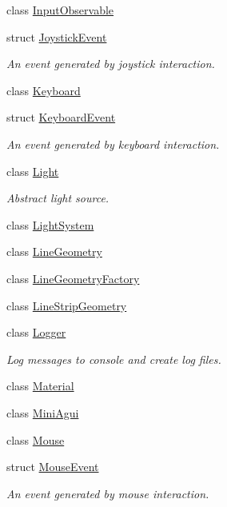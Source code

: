 \begin{DoxyCompactItemize}
class \mbox{\hyperlink{classec_1_1_input_observable}{Input\+Observable}}
\item 
struct \mbox{\hyperlink{structec_1_1_joystick_event}{Joystick\+Event}}
\begin{DoxyCompactList}\small\item\em An event generated by joystick interaction. \end{DoxyCompactList}\item 
class \mbox{\hyperlink{classec_1_1_keyboard}{Keyboard}}
\item 
struct \mbox{\hyperlink{structec_1_1_keyboard_event}{Keyboard\+Event}}
\begin{DoxyCompactList}\small\item\em An event generated by keyboard interaction. \end{DoxyCompactList}\item 
class \mbox{\hyperlink{classec_1_1_light}{Light}}
\begin{DoxyCompactList}\small\item\em Abstract light source. \end{DoxyCompactList}\item 
class \mbox{\hyperlink{classec_1_1_light_system}{Light\+System}}
\item 
class \mbox{\hyperlink{classec_1_1_line_geometry}{Line\+Geometry}}
\item 
class \mbox{\hyperlink{classec_1_1_line_geometry_factory}{Line\+Geometry\+Factory}}
\item 
class \mbox{\hyperlink{classec_1_1_line_strip_geometry}{Line\+Strip\+Geometry}}
\item 
class \mbox{\hyperlink{classec_1_1_logger}{Logger}}
\begin{DoxyCompactList}\small\item\em Log messages to console and create log files. \end{DoxyCompactList}\item 
class \mbox{\hyperlink{classec_1_1_material}{Material}}
\item 
class \mbox{\hyperlink{classec_1_1_mini_agui}{Mini\+Agui}}
\item 
class \mbox{\hyperlink{classec_1_1_mouse}{Mouse}}
\item 
struct \mbox{\hyperlink{structec_1_1_mouse_event}{Mouse\+Event}}
\begin{DoxyCompactList}\small\item\em An event generated by mouse interaction. \end{DoxyCompactList}\item 

\end{DoxyCompactItemize}
